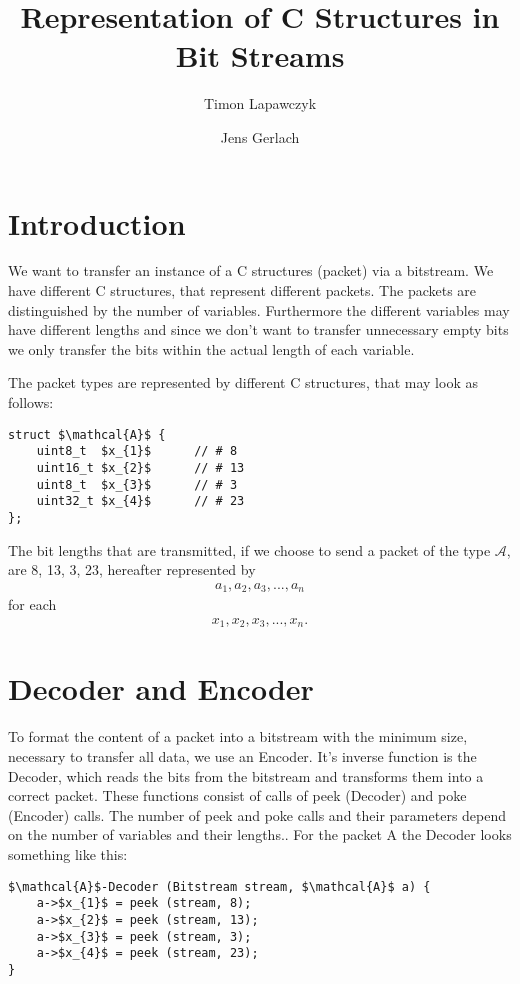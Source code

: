 \documentclass[paper=a4,DIV=12]{scrartcl}
\title{Representation of C Structures in Bit Streams}
\author{Timon Lapawczyk \and Jens Gerlach}
\begin{document}
\maketitle

\section{Introduction}

We want to transfer an instance of a C structures (packet) via a bitstream.
We have different C structures, that represent different packets.
The packets are distinguished by the number of variables.
Furthermore the different variables may have different lengths and
since we don't want to transfer unnecessary empty bits we only transfer
the bits within the actual length of each variable.

The packet types are represented by different C structures, that may look as follows:

\begin{lstlisting}[mathescape]
struct $\mathcal{A}$ {
	uint8_t  $x_{1}$      // # 8
	uint16_t $x_{2}$      // # 13
	uint8_t  $x_{3}$      // # 3
	uint32_t $x_{4}$      // # 23
};
\end{lstlisting}

The bit lengths that are transmitted, if we choose to send a packet of the type $\mathcal{A}$, are 8, 13, 3, 23, hereafter represented by 
\begin{align*}
	a_{1}, a_{2}, a_{3}, ... , a_{n}
\end{align*}
for each
\begin{align*}
	x_{1}, x_{2}, x_{3}, ... , x_{n}.
\end{align*}

\section{Decoder and Encoder}
To format the content of a packet into a bitstream with the minimum size, necessary to transfer all data, we use an Encoder. It's inverse function is the Decoder, which reads the bits
from the bitstream and transforms them into a correct packet.
These functions consist of calls of peek (Decoder) and poke (Encoder) calls. The number of peek and poke calls and their parameters depend on the number of variables and their lengths..
For the packet A the Decoder looks something like this:

\begin{lstlisting}[mathescape]
$\mathcal{A}$-Decoder (Bitstream stream, $\mathcal{A}$ a) {
	a->$x_{1}$ = peek (stream, 8);
	a->$x_{2}$ = peek (stream, 13);
	a->$x_{3}$ = peek (stream, 3);
	a->$x_{4}$ = peek (stream, 23);
}
\end{lstlisting}
\end{document}
